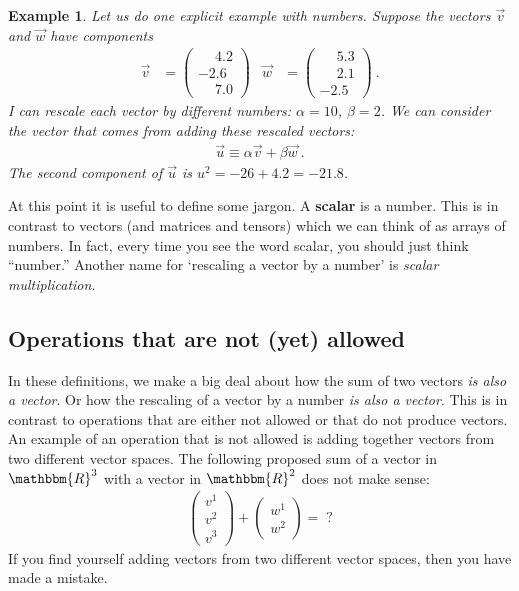 \documentclass[12pt]{article}
\newtheorem{example}{Example}[section]
\begin{document}
\begin{example}
Let us do one explicit example with numbers. Suppose the vectors $\vec{v}$ and $\vec{w}$ have components
\begin{align}
    \vec{v} &=
    \begin{pmatrix}
    \phantom{+}4.2\\
    -2.6\\
    \phantom{+}7.0        
    \end{pmatrix}
    &
    \vec{w} &=
    \begin{pmatrix}
    \phantom{+}5.3\\
    \phantom{+}2.1\\
    -2.5        
    \end{pmatrix} \ .
\end{align}
I can rescale each vector by different numbers: $\alpha = 10$, $\beta = 2$. We can consider the vector that comes from adding these rescaled vectors:
\begin{align}
    \vec{u} \equiv \alpha \vec{v} + \beta \vec{w} \ .
\end{align}
The second component of $\vec{u}$ is $u^2 = -26 + 4.2 = -21.8$.
\end{example}

At this point it is useful to define some jargon. A \textbf{scalar} is a number. This is in contrast to vectors (and matrices and tensors) which we can think of as arrays of numbers. In fact, every time you see the word scalar, you should just think ``number.'' Another name for `rescaling a vector by a number' is \emph{scalar multiplication}.

\subsection{Operations that are not (yet) allowed}

In these definitions, we make a big deal about how the sum of two vectors \emph{is also a vector}. Or how the rescaling of a vector by a number \emph{is also a vector}. This is in contrast to operations that are either not allowed or that do not produce vectors. An example of an operation that is not allowed is adding together vectors from two different vector spaces. The following proposed sum of a vector in $\mathbbm{R}^3$ with  a vector in $\mathbbm{R}^2$ does not make sense:
\begin{align}
    \begin{pmatrix}
        v^1\\ v^2 \\v^3
    \end{pmatrix}
    +
    \begin{pmatrix}
        w^1\\ w^2 
    \end{pmatrix}
    =
    \; ?
\end{align}
If you find yourself adding vectors from two different vector spaces, then you have made a mistake.
\end{document}
